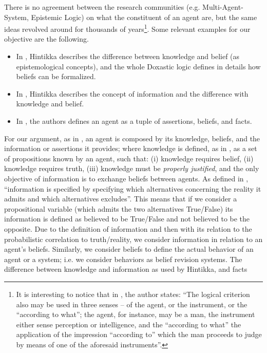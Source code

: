 \documentclass[conference]{IEEEtran}
\begin{document}
There is no agreement between the research communities (e.g.
Multi-Agent-System, Epistemic Logic) on what the constituent of an agent are,
but the same ideas revolved around for thousands of years\footnote{
It is interesting to notice that 
in \autocite{Empiricus1990Pyrrhonism}, the author states: ``The logical
criterion also may be used in three senses -- of the agent, or the instrument,
or the ``according to what''; the agent, for instance, may be a man, the
instrument either sense perception or intelligence, and the ``according to
what'' the application of the impression ``according to'' which the man
proceeds to judge by means of one of the aforesaid instruments''.}.
Some relevant examples for our objective are the following.
\begin{itemize}
	\item In \autocite{Hintikka1962knowledge}, Hintikka describes the
		difference between knowledge and belief (as epistemological
		concepts), and the whole Doxastic logic defines in details how
		beliefs can be formalized.
	\item In \autocite{Hintikka1993Information}, Hintikka describes the concept
		of information and the difference with knowledge and belief.
	\item In \autocite{Santaca2016abf}, the authors defines an agent as a
		tuple of assertions, beliefs, and facts.
\end{itemize}
For our argument, as in \autocite{Santaca2016abf}, an agent is composed by its
knowledge, beliefs, and the information or assertions it provides; where
knowledge is defined, as in \autocite{Steup2020epistemology}, as a set of
propositions known by an agent, such that: (i) knowledge requires belief, (ii)
knowledge requires truth, (iii) knowledge must be \emph{properly justified}, and
the only objective of information is to exchange beliefs between agents.  As
defined in \autocite{Hintikka1993Information}, ``information is specified by
specifying which alternatives concerning the reality it admits and which
alternatives excludes''. This means that if we consider a propositional
variable (which admits the two alternatives True/False) its information is
defined as believed to be True/False and not believed to be the opposite.  Due
to the definition of information and then with its relation to the
probabilistic correlation to truth/reality, we consider information in relation
to an agent's beliefs. Similarly, we consider beliefs to define the actual
behavior of an agent or a system; i.e. we consider behaviors as belief revision
systems.
The difference between knowledge and information as used by Hintikka, and facts
\end{document}
